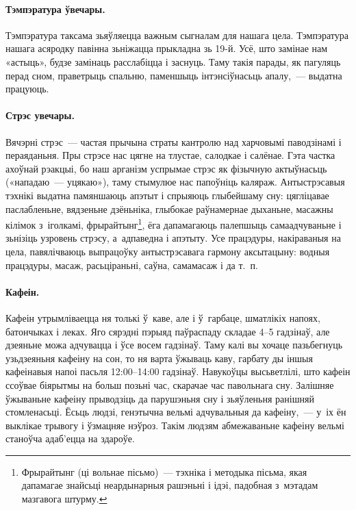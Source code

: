\paragraph{Тэмпэратура ўвечары.}
Тэмпэратура таксама зьяўляецца важным сыгналам для нашага цела. Тэмпэратура нашага асяродку павінна зьніжацца прыкладна зь 19-й. Усё, што замінае нам «астыць», будзе замінаць расслабіцца і заснуць. Таму такія парады, як пагуляць перад сном, праветрыць спальню, паменшыць інтэнсіўнасьць апалу,~--- выдатна працуюць.

\paragraph{Стрэс увечары.}
Вячэрні стрэс~--- частая прычына страты кантролю над харчовымі паводзінамі і пераяданьня. Пры стрэсе нас цягне на тлустае, салодкае і салёнае. Гэта частка ахоўнай рэакцыі, бо наш арганізм успрымае стрэс як фізычную актыўнасьць («нападаю~--- уцякаю»), таму стымулюе нас папоўніць каляраж. Антыстрэсавыя тэхнікі выдатна памяншаюць апэтыт і спрыяюць глыбейшаму сну: цягліцавае паслабленьне, вядзеньне дзёньніка, глыбокае раўнамернае дыханьне, масажны кілімок з~іголкамі, фрырайтынг\footnote{Фрырайтынг (ці вольнае пісьмо)~--- тэхніка і методыка пісьма, якая дапамагае знайсьці неардынарныя рашэньні і ідэі, падобная з~мэтадам мазгавога штурму.}, ёга дапамагаюць палепшыць самаадчуваньне і зьнізіць узровень стрэсу, а~адпаведна і апэтыту. Усе працэдуры, накіраваныя на цела, павялічваюць выпрацоўку антыстрэсавага гармону аксытацыну: водныя працэдуры, масаж, расьціраньні, саўна, самамасаж і да т.~п.

\paragraph{Кафеін.}
Кафеін утрымліваецца ня толькі ў~каве, але і ў~гарбаце, шматлікіх напоях, батончыках і леках. Яго сярэдні пэрыяд паўраспаду складае 4--5 гадзінаў, але дзеяньне можа адчувацца і ўсе восем гадзінаў. Таму калі вы хочаце пазьбегнуць узьдзеяньня кафеіну на сон, то ня варта ўжываць каву, гарбату ды іншыя кафеінавыя напоі пасьля 12:00–14:00 гадзінаў. Навукоўцы высьветлілі, што кафеін ссоўвае біярытмы на больш позьні час, скарачае час павольнага сну. Залішняе ўжываньне кафеіну прыводзіць да парушэньня сну і зьяўленьня ранішняй стомленасьці. Ёсьць людзі, генэтычна вельмі адчувальныя да кафеіну,~--- у~іх ён выклікае трывогу і ўзмацняе нэўроз. Такім людзям абмежаваньне кафеіну вельмі станоўча адаб'ецца на здароўе.

